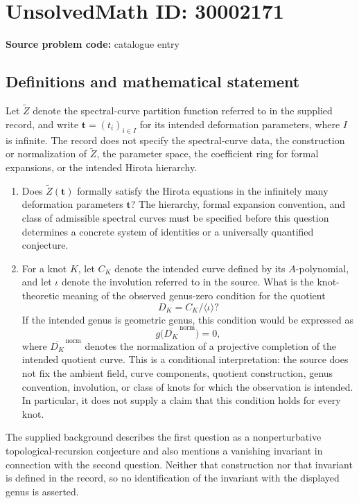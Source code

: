 \documentclass[11pt]{article}
\begin{document}
\section*{UnsolvedMath ID: 30002171}
\textbf{Source problem code:} catalogue entry
\subsection{Definitions and mathematical statement}
Let \(\widetilde Z\) denote the spectral-curve partition function referred to in the supplied record, and write \(\mathbf t=(t_i)_{i\in I}\) for its intended deformation parameters, where \(I\) is infinite. The record does not specify the spectral-curve data, the construction or normalization of \(\widetilde Z\), the parameter space, the coefficient ring for formal expansions, or the intended Hirota hierarchy.

\begin{enumerate}
\item Does \(\widetilde Z(\mathbf t)\) formally satisfy the Hirota equations in the infinitely many deformation parameters \(\mathbf t\)? The hierarchy, formal expansion convention, and class of admissible spectral curves must be specified before this question determines a concrete system of identities or a universally quantified conjecture.
\item For a knot \(K\), let \(C_K\) denote the intended curve defined by its \(A\)-polynomial, and let \(\iota\) denote the involution referred to in the source. What is the knot-theoretic meaning of the observed genus-zero condition for the quotient
\[
D_K=C_K/\langle\iota\rangle?
\]
If the intended genus is geometric genus, this condition would be expressed as
\[
g\bigl(\overline{D_K}^{\,\mathrm{norm}}\bigr)=0,
\]
where \(\overline{D_K}^{\,\mathrm{norm}}\) denotes the normalization of a projective completion of the intended quotient curve. This is a conditional interpretation: the source does not fix the ambient field, curve components, quotient construction, genus convention, involution, or class of knots for which the observation is intended. In particular, it does not supply a claim that this condition holds for every knot.
\end{enumerate}

The supplied background describes the first question as a nonperturbative topological-recursion conjecture and also mentions a vanishing invariant in connection with the second question. Neither that construction nor that invariant is defined in the record, so no identification of the invariant with the displayed genus is asserted.
\end{document}

